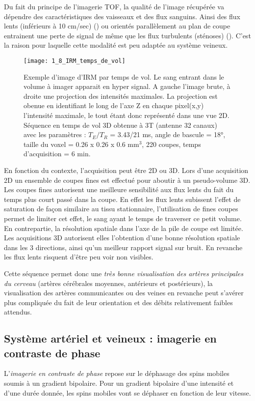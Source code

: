 Du fait du principe de l’imagerie TOF, la qualité de l’image récupérée va dépendre des caractéristiques des vaisseaux et des flux sanguins. Ainsi des flux lents (inférieurs à 10 cm/sec) (\cite{Offerman2011})  ou orientés parallèlement au plan de coupe entrainent une perte de signal de même que les flux turbulents (sténoses) (\cite{Bradley1984}). C’est la raison pour laquelle cette modalité est peu adaptée au système veineux.

\begin{figure}[!t]
\centering
\texttt{[image: 1\_8\_IRM\_temps\_de\_vol]}
\caption{Exemple d'image d'IRM par temps de vol. Le sang entrant dans le volume à imager apparait en hyper signal. A gauche l’image brute, à droite une projection des intensités maximales. La projection est obenue en identifiant le long de l'axe Z en chaque pixel(x,y) l'intensité maximale, le tout étant donc représenté dans une vue 2D. Séquence en temps de vol 3D obtenue à 3T (antenne 32 canaux) avec les paramètres : $T_E/T_R$ = 3.43/21 ms, angle de bascule = 18°, taille du voxel = 0.26 x 0.26 x 0.6 mm$^3$, 220 coupes, temps d'acquisition = 6 min.}
\label{fig:1_8_IRM_temps_de_vol}	
\end{figure}
En fonction du contexte, l’acquisition peut être 2D ou 3D. Lors d’une acquisition 2D un ensemble de coupes fines est effectué pour aboutir à un pseudo-volume 3D. Les coupes fines autorisent une meilleure sensibilité aux flux lents du fait du temps plus court passé dans la coupe. En effet les flux lents subissent l'effet de saturation de façon similaire au tissu stationnaire, l'utilisation de fines coupes permet de limiter cet effet, le sang ayant le temps de traverser ce petit volume. En contrepartie, la résolution spatiale dans l’axe de la pile de coupe est limitée. Les acquisitions 3D autorisent elles l’obtention d’une bonne résolution spatiale dans les 3 directions, ainsi qu’un meilleur rapport signal sur bruit. En revanche les flux lents risquent d’être peu voir non visibles.

Cette séquence permet donc une {\em très bonne visualisation des artères principales du cerveau} (artères cérébrales moyennes, antérieurs et postérieurs), la visualisation des artères communicantes ou des veines en revanche peut s’avérer plus compliquée du fait de leur orientation et des débits relativement faibles attendus.
\subsection{Système artériel et veineux : imagerie en contraste de phase}
L’{\em imagerie en contraste de phase} repose sur le déphasage des spins mobiles soumis à un gradient bipolaire. Pour un gradient bipolaire d’une intensité et d’une durée donnée, les spins mobiles vont se déphaser en fonction de leur vitesse.

